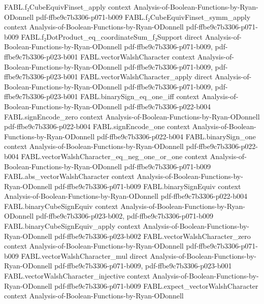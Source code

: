 \begin{theorem}
  {FABL.f₂CubeEquivFinset_apply}
  {context}
  {Analysis-of-Boolean-Functions-by-Ryan-ODonnell}
  {pdf-ffbe9c7b3306-p071-b009}
\proofstep
  {FABL.f₂CubeEquivFinset_symm_apply}
  {context}
  {Analysis-of-Boolean-Functions-by-Ryan-ODonnell}
  {pdf-ffbe9c7b3306-p071-b009}
\proofstep
  {FABL.f₂DotProduct_eq_coordinateSum_f₂Support}
  {direct}
  {Analysis-of-Boolean-Functions-by-Ryan-ODonnell}
  {pdf-ffbe9c7b3306-p071-b009,
    pdf-ffbe9c7b3306-p023-b001}
\proofstep
  {FABL.vectorWalshCharacter}
  {context}
  {Analysis-of-Boolean-Functions-by-Ryan-ODonnell}
  {pdf-ffbe9c7b3306-p071-b009,
    pdf-ffbe9c7b3306-p023-b001}
\proofstep
  {FABL.vectorWalshCharacter_apply}
  {direct}
  {Analysis-of-Boolean-Functions-by-Ryan-ODonnell}
  {pdf-ffbe9c7b3306-p071-b009,
    pdf-ffbe9c7b3306-p023-b001}
\proofstep
  {FABL.binarySign_eq_one_iff}
  {context}
  {Analysis-of-Boolean-Functions-by-Ryan-ODonnell}
  {pdf-ffbe9c7b3306-p022-b004}
\proofstep
  {FABL.signEncode_zero}
  {context}
  {Analysis-of-Boolean-Functions-by-Ryan-ODonnell}
  {pdf-ffbe9c7b3306-p022-b004}
\proofstep
  {FABL.signEncode_one}
  {context}
  {Analysis-of-Boolean-Functions-by-Ryan-ODonnell}
  {pdf-ffbe9c7b3306-p022-b004}
\proofstep
  {FABL.binarySign_one}
  {context}
  {Analysis-of-Boolean-Functions-by-Ryan-ODonnell}
  {pdf-ffbe9c7b3306-p022-b004}
\proofstep
  {FABL.vectorWalshCharacter_eq_neg_one_or_one}
  {context}
  {Analysis-of-Boolean-Functions-by-Ryan-ODonnell}
  {pdf-ffbe9c7b3306-p071-b009}
\proofstep
  {FABL.abs_vectorWalshCharacter}
  {context}
  {Analysis-of-Boolean-Functions-by-Ryan-ODonnell}
  {pdf-ffbe9c7b3306-p071-b009}
\proofstep
  {FABL.binarySignEquiv}
  {context}
  {Analysis-of-Boolean-Functions-by-Ryan-ODonnell}
  {pdf-ffbe9c7b3306-p022-b004}
\proofstep
  {FABL.binaryCubeSignEquiv}
  {context}
  {Analysis-of-Boolean-Functions-by-Ryan-ODonnell}
  {pdf-ffbe9c7b3306-p023-b002,
    pdf-ffbe9c7b3306-p071-b009}
\proofstep
  {FABL.binaryCubeSignEquiv_apply}
  {context}
  {Analysis-of-Boolean-Functions-by-Ryan-ODonnell}
  {pdf-ffbe9c7b3306-p023-b002}
\proofstep
  {FABL.vectorWalshCharacter_zero}
  {context}
  {Analysis-of-Boolean-Functions-by-Ryan-ODonnell}
  {pdf-ffbe9c7b3306-p071-b009}
\proofstep
  {FABL.vectorWalshCharacter_mul}
  {direct}
  {Analysis-of-Boolean-Functions-by-Ryan-ODonnell}
  {pdf-ffbe9c7b3306-p071-b009,
    pdf-ffbe9c7b3306-p023-b001}
\proofstep
  {FABL.vectorWalshCharacter_injective}
  {context}
  {Analysis-of-Boolean-Functions-by-Ryan-ODonnell}
  {pdf-ffbe9c7b3306-p071-b009}
\proofstep
  {FABL.expect_vectorWalshCharacter}
  {context}
  {Analysis-of-Boolean-Functions-by-Ryan-ODonnell}

\end{theorem}
